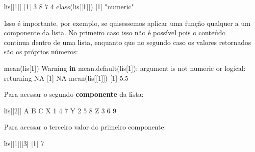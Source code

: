 \documentclass[
  10pt,
  a4paper]{book}
\newenvironment{Shaded}{\begin{snugshade}}{\end{snugshade}}
\newcommand{\ConstantTok}[1]{\textcolor[rgb]{0.00,0.00,0.00}{#1}}
\newcommand{\ControlFlowTok}[1]{\textcolor[rgb]{0.13,0.29,0.53}{\textbf{#1}}}
\newcommand{\DecValTok}[1]{\textcolor[rgb]{0.00,0.00,0.81}{#1}}
\newcommand{\FloatTok}[1]{\textcolor[rgb]{0.00,0.00,0.81}{#1}}
\newcommand{\FunctionTok}[1]{\textcolor[rgb]{0.00,0.00,0.00}{#1}}
\newcommand{\NormalTok}[1]{#1}
\newcommand{\SpecialCharTok}[1]{\textcolor[rgb]{0.00,0.00,0.00}{#1}}
\newcommand{\StringTok}[1]{\textcolor[rgb]{0.31,0.60,0.02}{#1}}
\begin{document}
\begin{Shaded}
\begin{Highlighting}[]
\NormalTok{lis[[}\DecValTok{1}\NormalTok{]]}
\NormalTok{[}\DecValTok{1}\NormalTok{] }\DecValTok{3} \DecValTok{8} \DecValTok{7} \DecValTok{4}
\FunctionTok{class}\NormalTok{(lis[[}\DecValTok{1}\NormalTok{]])}
\NormalTok{[}\DecValTok{1}\NormalTok{] }\StringTok{"numeric"}
\end{Highlighting}
\end{Shaded}

Isso é importante, por exemplo, se quisessemos aplicar uma função
qualquer a um componente da lista. No primeiro caso isso não é possível
pois o conteúdo continua dentro de uma lista, enquanto que no segundo
caso os valores retornados são os próprios números:

\begin{Shaded}
\begin{Highlighting}[]
\FunctionTok{mean}\NormalTok{(lis[}\DecValTok{1}\NormalTok{])}
\NormalTok{Warning }\ControlFlowTok{in} \FunctionTok{mean.default}\NormalTok{(lis[}\DecValTok{1}\NormalTok{])}\SpecialCharTok{:}\NormalTok{ argument is not numeric or logical}\SpecialCharTok{:}\NormalTok{ returning}
\ConstantTok{NA}
\NormalTok{[}\DecValTok{1}\NormalTok{] }\ConstantTok{NA}
\FunctionTok{mean}\NormalTok{(lis[[}\DecValTok{1}\NormalTok{]])}
\NormalTok{[}\DecValTok{1}\NormalTok{] }\FloatTok{5.5}
\end{Highlighting}
\end{Shaded}

Para acessar o segundo \textbf{componente} da lista:

\begin{Shaded}
\begin{Highlighting}[]
\NormalTok{lis[[}\DecValTok{2}\NormalTok{]]}
\NormalTok{  A B C}
\NormalTok{X }\DecValTok{1} \DecValTok{4} \DecValTok{7}
\NormalTok{Y }\DecValTok{2} \DecValTok{5} \DecValTok{8}
\NormalTok{Z }\DecValTok{3} \DecValTok{6} \DecValTok{9}
\end{Highlighting}
\end{Shaded}

Para acessar o terceiro valor do primeiro componente:

\begin{Shaded}
\begin{Highlighting}[]
\NormalTok{lis[[}\DecValTok{1}\NormalTok{]][}\DecValTok{3}\NormalTok{]}
\NormalTok{[}\DecValTok{1}\NormalTok{] }\DecValTok{7}
\end{Highlighting}
\end{Shaded}
\end{document}
